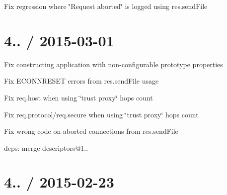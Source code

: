 \begin{DoxyItemize}
\item Fix regression where {\ttfamily \char`\"{}\+Request aborted\char`\"{}} is logged using {\ttfamily res.\+send\+File}
\end{DoxyItemize}

\section*{4.. / 2015-\/03-\/01 }


\begin{DoxyItemize}
\item Fix constructing application with non-\/configurable prototype properties
\item Fix {\ttfamily E\+C\+O\+N\+N\+R\+E\+S\+E\+T} errors from {\ttfamily res.\+send\+File} usage
\item Fix {\ttfamily req.\+host} when using \char`\"{}trust proxy\char`\"{} hops count
\item Fix {\ttfamily req.\+protocol}/{\ttfamily req.\+secure} when using \char`\"{}trust proxy\char`\"{} hops count
\item Fix wrong {\ttfamily code} on aborted connections from {\ttfamily res.\+send\+File}
\item deps\+: merge-\/descriptors@1..
\end{DoxyItemize}

\section*{4.. / 2015-\/02-\/23 }


